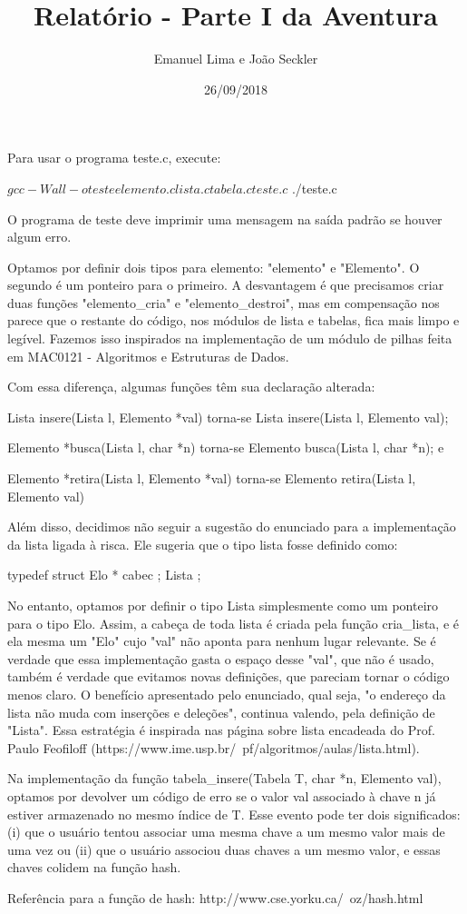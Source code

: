 \documentclass{article}
\title{Relatório - Parte I da Aventura}
\date{26/09/2018}
\author{Emanuel Lima e João Seckler}
\begin{document}
\maketitle

Para usar o programa teste.c, execute:

\begin{spverbatim}
$ gcc -Wall -o teste elemento.c lista.c tabela.c teste.c
$ ./teste.c
\end{spverbatim}
  
\medskip

O programa de teste deve imprimir uma mensagem na saída padrão se houver algum  erro.

Optamos por definir dois tipos para elemento: "elemento" e "Elemento". O segundo é um ponteiro para o primeiro. A desvantagem é que precisamos criar duas funções "elemento\_cria" e "elemento\_destroi", mas em compensação nos parece que o restante do código, nos módulos de lista e tabelas, fica mais limpo e legível. Fazemos isso inspirados na implementação de um módulo de pilhas feita em MAC0121 - Algoritmos e Estruturas de Dados.

Com essa diferença, algumas funções têm sua declaração alterada:

Lista insere(Lista l, Elemento *val)
torna-se Lista
insere(Lista l, Elemento val);

Elemento *busca(Lista l, char *n)
torna-se
Elemento busca(Lista l, char *n); e

Elemento *retira(Lista l, Elemento *val)
torna-se
Elemento retira(Lista l, Elemento val)

Além disso, decidimos não seguir a sugestão do enunciado para a implementação da lista ligada à risca. Ele sugeria que o tipo lista fosse definido como:

typedef struct {
  Elo * cabec ;
} Lista ;

No entanto, optamos por definir o tipo Lista simplesmente como um ponteiro para o tipo Elo. Assim, a cabeça de toda lista é criada pela função cria\_lista, e é ela mesma um "Elo" cujo "val" não aponta para nenhum lugar relevante. Se é verdade que essa implementação gasta o espaço desse "val", que não é usado, também é verdade que evitamos novas definições, que pareciam tornar o código menos claro. O benefício apresentado pelo enunciado, qual seja, "o endereço da lista não muda com inserções e deleções", continua valendo, pela definição de "Lista". Essa estratégia é inspirada nas página sobre lista encadeada do Prof. Paulo Feofiloff (https://www.ime.usp.br/~pf/algoritmos/aulas/lista.html).

Na implementação da função tabela\_insere(Tabela T, char *n, Elemento val), optamos por devolver um código de erro se o valor val associado à chave n já estiver armazenado no mesmo índice de T. Esse evento pode ter dois significados: (i) que o usuário tentou associar uma mesma chave a um mesmo valor mais de uma vez ou (ii) que o usuário associou duas chaves a um mesmo valor, e essas chaves colidem na função hash.

Referência para a função de hash: http://www.cse.yorku.ca/~oz/hash.html 
\end{document}

